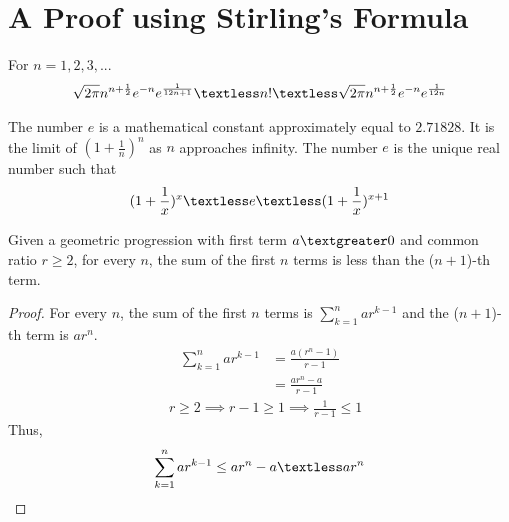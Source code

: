 \section{A Proof using Stirling's Formula}
\begin{lemma}\label{Stirling}
 For $n=1,2,3,...$
\begin{align}
    \nonumber \sqrt{2\pi}n^{n+\frac{1}{2}}e^{-n}e^{\frac{1}{12n+1}}\textless n! \textless \sqrt{2\pi}n^{n+\frac{1}{2}}e^{-n}e^{\frac{1}{12n}} 
\end{align}
\end{lemma}
\begin{definition}\label{e}
The number $e$ is a mathematical constant approximately equal to $2.71828$. It is the limit of $(1+\frac{1}{n})^n$ as $n$ approaches infinity. The number $e$ is the unique real number such that
\begin{align}
    \nonumber (1+\frac{1}{x})^{x} \textless e \textless (1+\frac{1}{x})^{x+1}
\end{align}
\end{definition}
\begin{lemma}\label{gp}
Given a geometric progression with first term $a \textgreater 0$ and common ratio $r \ge 2$, for every $n$, the sum of the first $n$ terms is less than the ($n+1$)-th term.
\end{lemma}
\begin{proof}
For every $n$, the sum of the first $n$ terms is $\sum_{k=1}^{n}ar^{k-1}$ and the ($n+1$)-th term is $ar^{n}$.
\begin{align}
    \nonumber \sum_{k=1}^{n}ar^{k-1}&=\frac{a(r^{n}-1)}{r-1}\\
    \nonumber &=\frac{ar^{n}-a}{r-1}
\end{align}
\begin{align}
    \nonumber &r\ge 2 \implies r-1 \ge 1 \implies \frac{1}{r-1} \le 1
\end{align}
Thus, 
\begin{align}
    \nonumber \sum_{k=1}^{n}ar^{k-1}\le ar^{n}-a \textless ar^{n}
\end{align} 
\end{proof}


